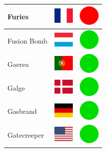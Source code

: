 \documentclass[12pt, a4paper, twoside]{report}
\begin{document}
\begin{center}
\begin{longtable}{|p{5cm}|p{2cm}|p{2cm}|}
 Furies                                                     & \includegraphics[width=1cm]{../img/flags/fr} &   \includegraphics[width=1cm]{../likes/n} \\ \hline
 Fusion Bomb                                                & \includegraphics[width=1cm]{../img/flags/lu} &   \includegraphics[width=1cm]{../likes/y} \\ \hline
 Gaerea                                                     & \includegraphics[width=1cm]{../img/flags/pt} &   \includegraphics[width=1cm]{../likes/y} \\ \hline
 Galge                                                      & \includegraphics[width=1cm]{../img/flags/dk} &   \includegraphics[width=1cm]{../likes/y} \\ \hline
 Gasbrand                                                   & \includegraphics[width=1cm]{../img/flags/de} &   \includegraphics[width=1cm]{../likes/y} \\ \hline
 Gatecreeper                                                & \includegraphics[width=1cm]{../img/flags/us} &   \includegraphics[width=1cm]{../likes/y} \\ \hline

\end{longtable}
\end{center}
\end{document}
